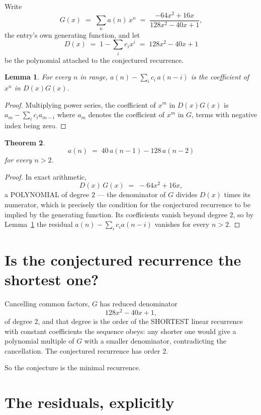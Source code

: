 \documentclass[11pt,a4paper]{article}
\theoremstyle{plain}
\newtheorem{theorem}{Theorem}
\newtheorem{lemma}[theorem]{Lemma}
\theoremstyle{definition}
\begin{document}
Write
\[
G(x)\;=\;\sum_{n}a(n)\,x^{n}\;=\;\frac{- 64 x^{2} + 16 x}{128 x^{2} - 40 x + 1},
\]
the entry's own generating function, and let
\[
D(x)\;=\;1-\sum_i c_i x^{i}\;=\;128 x^{2} - 40 x + 1
\]
be the polynomial attached to the conjectured recurrence.

\begin{lemma}\label{lem:key}
For every $n$ in range, $a(n)-\sum_i c_i\,a(n-i)$ is the coefficient of $x^{n}$ in
$D(x)G(x)$.
\end{lemma}

\begin{proof}
Multiplying power series, the coefficient of $x^{m}$ in $D(x)G(x)$ is
$a_m-\sum_i c_i a_{m-i}$ where $a_m$ denotes the coefficient of $x^{m}$ in $G$, terms with
negative index being zero.
\end{proof}

\begin{theorem}
\[
a(n)\;=\;40\,a(n-1) - 128\,a(n-2)
\]
for every $n>2$.
\end{theorem}

\begin{proof}
In exact arithmetic,
\[
D(x)\,G(x)\;=\;- 64 x^{2} + 16 x,
\]
a POLYNOMIAL of degree $2$ --- the denominator of $G$ divides $D(x)$ times its numerator,
which is precisely the condition for the conjectured recurrence to be implied by the
generating function. Its coefficients vanish beyond degree $2$, so by
Lemma~\ref{lem:key} the residual $a(n)-\sum_ic_ia(n-i)$ vanishes for every
$n>2$.
\end{proof}

\section{Is the conjectured recurrence the shortest one?}

Cancelling common factors, $G$ has reduced denominator
\[
128 x^{2} - 40 x + 1,
\]
of degree $2$, and that degree is the order of the SHORTEST linear recurrence with
constant coefficients the sequence obeys: any shorter one would give a polynomial multiple of
$G$ with a smaller denominator, contradicting the cancellation. The conjectured recurrence has
order $2$.

So the conjecture is the minimal recurrence.

\section{The residuals, explicitly}
\end{document}

